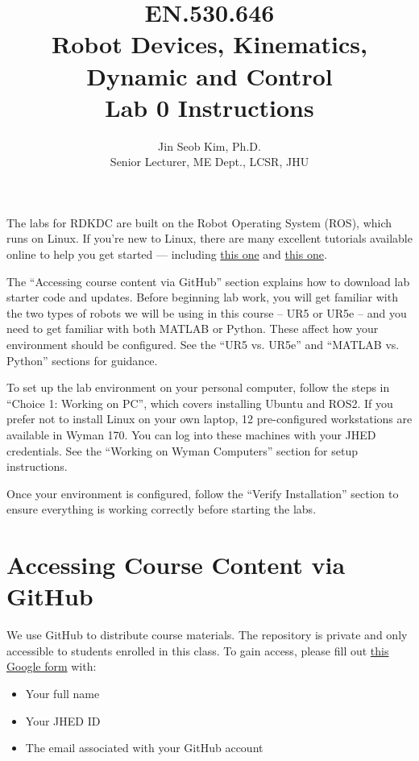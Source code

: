 \documentclass[hidelinks]{article}
\title{EN.530.646 \\
Robot Devices, Kinematics, Dynamic and Control \\Lab 0 Instructions}
\author{Jin Seob Kim, Ph.D.\\
Senior Lecturer, ME Dept., LCSR, JHU}
\date{}
\begin{document}
\maketitle
\vspace{-0.1in}
\begin{center}
\noindent
{}
\end{center}

The labs for RDKDC are built on the Robot Operating System (ROS), which runs on Linux. If you're new to Linux, there are many excellent tutorials available online to help you get started — including \href{https://linuxjourney.com}{\color{blue}this one} and \href{https://www.guru99.com/linux-commands-cheat-sheet.html}{\color{blue}this one}.

\vspace{0.1in}
The “Accessing course content via GitHub” section explains how to download lab starter code and updates. Before beginning lab work, you will get familiar with the two types of robots we will be using in this course -- UR5 or UR5e -- and you need to get familiar with both MATLAB or Python. These affect how your environment should be configured. See the “UR5 vs. UR5e” and “MATLAB vs. Python” sections for guidance.

\vspace{0.1in}
To set up the lab environment on your personal computer, follow the steps in “Choice 1: Working on PC”, which covers installing Ubuntu and ROS2. If you prefer not to install Linux on your own laptop, 12 pre-configured workstations are available in Wyman 170. You can log into these machines with your JHED credentials. See the “Working on Wyman Computers” section for setup instructions.

\vspace{0.1in}
Once your environment is configured, follow the “Verify Installation” section to ensure everything is working correctly before starting the labs.

\section*{Accessing Course Content via GitHub}

We use GitHub to distribute course materials. The repository is private and only accessible to students enrolled in this class. To gain access, please fill out \href{https://docs.google.com/forms/d/13va2CeKDCR6VveB_4l6r5Z6sduOZegped-RVWqcanms/edit}{\color{blue}this Google form} with:
\begin{itemize}[noitemsep]
    \item Your full name
    \item Your JHED ID
    \item The email associated with your GitHub account
\end{itemize}
\end{document}
